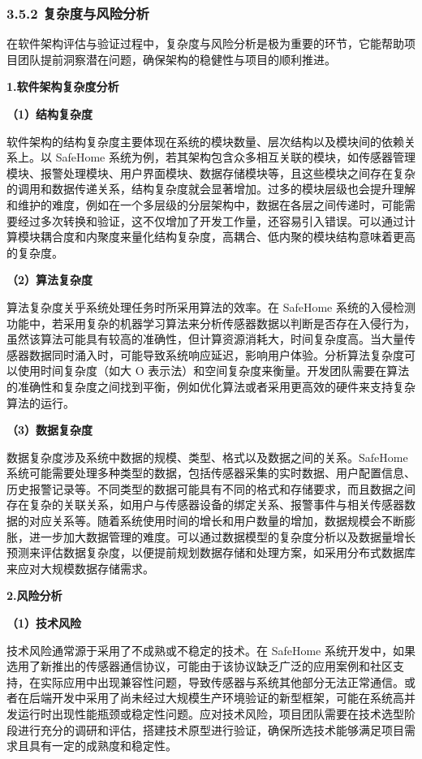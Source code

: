 \subsubsection{3.5.2 复杂度与风险分析}\label{ux590dux6742ux5ea6ux4e0eux98ceux9669ux5206ux6790}

在软件架构评估与验证过程中，复杂度与风险分析是极为重要的环节，它能帮助项目团队提前洞察潜在问题，确保架构的稳健性与项目的顺利推进。

\textbf{1.软件架构复杂度分析}

\textbf{（1）结构复杂度}

软件架构的结构复杂度主要体现在系统的模块数量、层次结构以及模块间的依赖关系上。以 SafeHome 系统为例，若其架构包含众多相互关联的模块，如传感器管理模块、报警处理模块、用户界面模块、数据存储模块等，且这些模块之间存在复杂的调用和数据传递关系，结构复杂度就会显著增加。过多的模块层级也会提升理解和维护的难度，例如在一个多层级的分层架构中，数据在各层之间传递时，可能需要经过多次转换和验证，这不仅增加了开发工作量，还容易引入错误。可以通过计算模块耦合度和内聚度来量化结构复杂度，高耦合、低内聚的模块结构意味着更高的复杂度。

\textbf{（2）算法复杂度}

算法复杂度关乎系统处理任务时所采用算法的效率。在 SafeHome 系统的入侵检测功能中，若采用复杂的机器学习算法来分析传感器数据以判断是否存在入侵行为，虽然该算法可能具有较高的准确性，但计算资源消耗大，时间复杂度高。当大量传感器数据同时涌入时，可能导致系统响应延迟，影响用户体验。分析算法复杂度可以使用时间复杂度（如大 O 表示法）和空间复杂度来衡量。开发团队需要在算法的准确性和复杂度之间找到平衡，例如优化算法或者采用更高效的硬件来支持复杂算法的运行。

\textbf{（3）数据复杂度}

数据复杂度涉及系统中数据的规模、类型、格式以及数据之间的关系。SafeHome 系统可能需要处理多种类型的数据，包括传感器采集的实时数据、用户配置信息、历史报警记录等。不同类型的数据可能具有不同的格式和存储要求，而且数据之间存在复杂的关联关系，如用户与传感器设备的绑定关系、报警事件与相关传感器数据的对应关系等。随着系统使用时间的增长和用户数量的增加，数据规模会不断膨胀，进一步加大数据管理的难度。可以通过数据模型的复杂度分析以及数据量增长预测来评估数据复杂度，以便提前规划数据存储和处理方案，如采用分布式数据库来应对大规模数据存储需求。

\textbf{2.风险分析}

\textbf{（1）技术风险}

技术风险通常源于采用了不成熟或不稳定的技术。在 SafeHome 系统开发中，如果选用了新推出的传感器通信协议，可能由于该协议缺乏广泛的应用案例和社区支持，在实际应用中出现兼容性问题，导致传感器与系统其他部分无法正常通信。或者在后端开发中采用了尚未经过大规模生产环境验证的新型框架，可能在系统高并发运行时出现性能瓶颈或稳定性问题。应对技术风险，项目团队需要在技术选型阶段进行充分的调研和评估，搭建技术原型进行验证，确保所选技术能够满足项目需求且具有一定的成熟度和稳定性。

